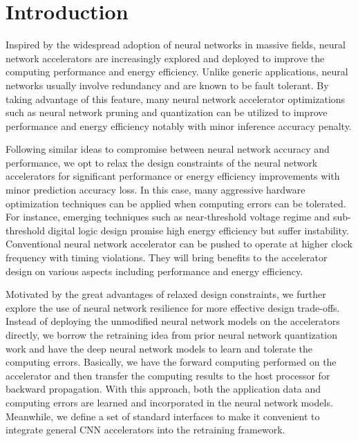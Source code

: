 \section{Introduction} \label{sec:intro}
Inspired by the widespread adoption of neural networks in massive fields, neural network accelerators 
\cite{deepburing_12,DiCecco_4} 
are increasingly explored and deployed to improve the computing performance and energy efficiency.
Unlike generic applications, neural networks usually involve redundancy and are known to be 
fault tolerant\cite{Reagen2016}. By taking advantage of this feature, many neural network accelerator optimizations 
such as neural network pruning and quantization can be utilized to improve 
performance and energy efficiency notably with minor inference accuracy penalty\cite{Han2016DeepCC}. 

Following similar ideas to compromise between neural network accuracy and performance, 
we opt to relax the design constraints of the neural network accelerators 
for significant performance or energy efficiency improvements with 
minor prediction accuracy loss. In this case, many aggressive hardware 
optimization techniques can be applied when computing errors can 
be tolerated. For instance, emerging techniques such as
near-threshold voltage regime\cite{RG2010NT} and sub-threshold digital
logic design\cite{BH2005} promise high energy efficiency but suffer
instability\cite{Pu2010NT}. Conventional neural network accelerator can
be pushed to operate at higher clock frequency with timing
violations\cite{overclock_3}. They will bring benefits to the accelerator design 
on various aspects including performance and energy efficiency.

Motivated by the great advantages of relaxed design constraints,
we further explore the use of neural network resilience
for more effective design trade-offs. Instead of deploying the 
unmodified neural network models on the accelerators directly, 
we borrow the retraining idea from prior neural network 
quantization work\cite{Hwang2014_17} and have the deep neural network models to 
learn and tolerate the computing errors.
Basically, we have the forward computing
performed on the accelerator and then transfer the computing
results to the host processor for backward propagation. With
this approach, both the application data and computing errors
are learned and incorporated in the neural network models.
Meanwhile, we define a set of standard interfaces to make
it convenient to integrate general CNN accelerators into the
retraining framework.


